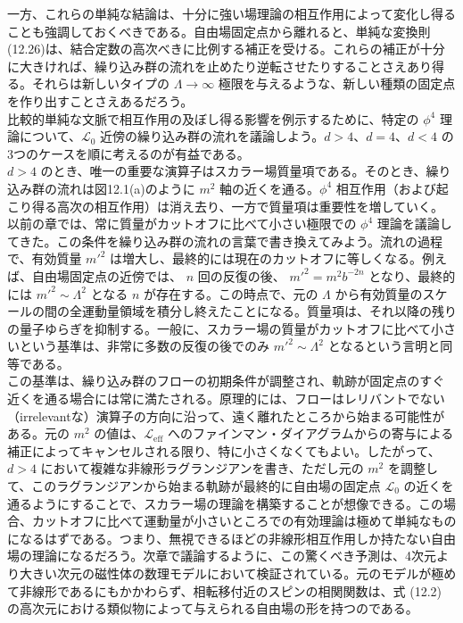 \documentclass[uplatex,dvipdfmx]{jsarticle}
\begin{document}
一方、これらの単純な結論は、十分に強い場理論の相互作用によって変化し得ることも強調しておくべきである。自由場固定点から離れると、単純な変換則(12.26)は、結合定数の高次べきに比例する補正を受ける。これらの補正が十分に大きければ、繰り込み群の流れを止めたり逆転させたりすることさえあり得る。それらは新しいタイプの $\Lambda \to \infty$ 極限を与えるような、新しい種類の固定点を作り出すことさえあるだろう。\\
比較的単純な文脈で相互作用の及ぼし得る影響を例示するために、特定の $\phi^4$ 理論について、$\mathcal{L}_0$ 近傍の繰り込み群の流れを議論しよう。$d > 4$、$d = 4$、$d < 4$ の3つのケースを順に考えるのが有益である。\\
$d > 4$ のとき、唯一の重要な演算子はスカラー場質量項である。そのとき、繰り込み群の流れは図12.1(a)のように $m^2$ 軸の近くを通る。$\phi^4$ 相互作用（および起こり得る高次の相互作用）は消え去り、一方で質量項は重要性を増していく。\\
以前の章では、常に質量がカットオフに比べて小さい極限での $\phi^4$ 理論を議論してきた。この条件を繰り込み群の流れの言葉で書き換えてみよう。流れの過程で、有効質量 $m'^2$ は増大し、最終的には現在のカットオフに等しくなる。例えば、自由場固定点の近傍では、 $n$ 回の反復の後、 $m'^2 = m^2 b^{-2n}$ となり、最終的には $m'^2 \sim \Lambda^2$ となる $n$ が存在する。この時点で、元の $\Lambda$ から有効質量のスケールの間の全運動量領域を積分し終えたことになる。質量項は、それ以降の残りの量子ゆらぎを抑制する。一般に、スカラー場の質量がカットオフに比べて小さいという基準は、非常に多数の反復の後でのみ $m'^2 \sim \Lambda^2$ となるという言明と同等である。\\
この基準は、繰り込み群のフローの初期条件が調整され、軌跡が固定点のすぐ近くを通る場合には常に満たされる。原理的には、フローはレリバントでない（irrelevantな）演算子の方向に沿って、遠く離れたところから始まる可能性がある。元の $m^2$ の値は、$\mathcal{L}_{\text{eff}}$ へのファインマン・ダイアグラムからの寄与による補正によってキャンセルされる限り、特に小さくなくてもよい。したがって、$d > 4$ において複雑な非線形ラグランジアンを書き、ただし元の $m^2$ を調整して、このラグランジアンから始まる軌跡が最終的に自由場の固定点 $\mathcal{L}_0$ の近くを通るようにすることで、スカラー場の理論を構築することが想像できる。この場合、カットオフに比べて運動量が小さいところでの有効理論は極めて単純なものになるはずである。つまり、無視できるほどの非線形相互作用しか持たない自由場の理論になるだろう。次章で議論するように、この驚くべき予測は、4次元より大きい次元の磁性体の数理モデルにおいて検証されている。元のモデルが極めて非線形であるにもかかわらず、相転移付近のスピンの相関関数は、式 (12.2) の高次元における類似物によって与えられる自由場の形を持つのである。\\
\end{document}
